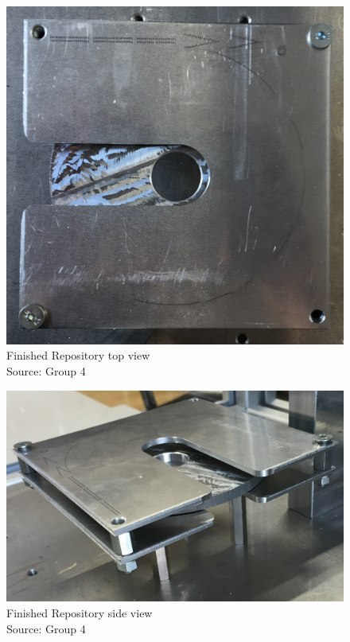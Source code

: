 \documentclass[a4paper,12pt]{scrreprt}
\begin{document}
  \begin{figure}[H]
  \centering
   \includegraphics[width=1\textwidth]{pictures/rep_top_view}
   \caption[Finished \acs{Repository} top view]{Finished \acs{Repository} top view\\
	Source: Group 4  
   }
   \label{fig:rep_top_view}
\end{figure} 

  \begin{figure}[H]
  \centering
   \includegraphics[width=1\textwidth]{pictures/rep_side_view}
   \caption[Finished \acs{Repository} side view]{Finished \acs{Repository} side view\\
	Source: Group 4  
   }
   \label{fig:rep_side_view}
\end{figure} 
\end{document}
